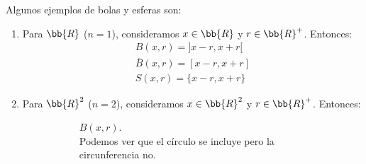 \begin{ejemplo} Algunos ejemplos de bolas y esferas son:
    \begin{enumerate}
        \item Para $\bb{R}$ ($n=1$), consideramos $x\in \bb{R}$ y $r\in \bb{R}^+$. Entonces:
        \begin{gather*}
            B(x,r)=]x-r, x+r[ \\
            \overline{B}(x,r)=[x-r, x+r] \\
            S(x,r)=\{x-r, x+r\}
        \end{gather*}

        \item Para $\bb{R}^2$ ($n=2$), consideramos $x\in \bb{R}^2$ y $r\in \bb{R}^+$. Entonces:
        \begin{figure}[H]
            \begin{subfigure}[b]{0.3\textwidth}
                \centering
                \caption{$B(x,r)$.\\{\centering Podemos ver que el círculo se incluye pero la circunferencia no.}}
            \end{subfigure}
            \hfill
            \begin{subfigure}[b]{0.3\textwidth}
                \centering
\end{subfigure}
\end{figure}
\end{enumerate}
\end{ejemplo}
